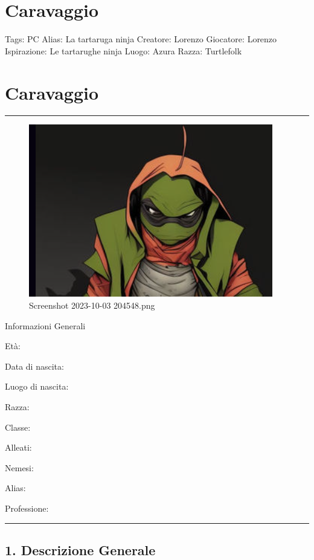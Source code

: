 \section{Caravaggio}\label{caravaggio}

Tags: PC Alias: La tartaruga ninja Creatore: Lorenzo Giocatore: Lorenzo
Ispirazione: Le tartarughe ninja Luogo: Azura Razza: Turtlefolk

\section{Caravaggio}\label{caravaggio-1}

\begin{center}\rule{0.5\linewidth}{0.5pt}\end{center}

\begin{figure}
\centering
\includegraphics{Screenshot_2023-10-03_204548.png}
\caption{Screenshot 2023-10-03 204548.png}
\end{figure}

Informazioni Generali

Età:

Data di nascita:

Luogo di nascita:

Razza:

Classe:

Alleati:

Nemesi:

Alias:

Professione:

\begin{center}\rule{0.5\linewidth}{0.5pt}\end{center}

\subsection{1. Descrizione Generale}\label{descrizione-generale}

